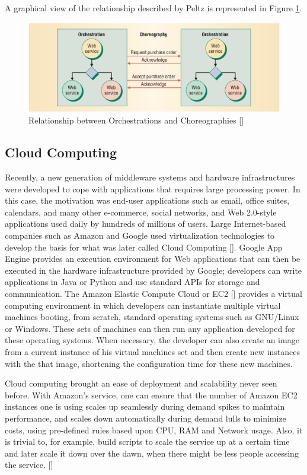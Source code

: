 A graphical view of the relationship described by Peltz is represented in Figure \ref{relation-orchestrationXchoreography}.

\begin{figure}[htb]
	\centering
	\includegraphics[width=\textwidth]{images/relation-orchestrationXchoreography}
	\caption{Relationship between Orchestrations and Choreographies [\citet{WSOC}]}
	\label{relation-orchestrationXchoreography}
\end{figure}




\subsection{Cloud Computing}
Recently, a new generation of middleware systems and hardware infrastructures were developed to cope with applications that requires large processing power. In this case, the motivation was end-user applications such as email, office suites, calendars, and many other e-commerce, social networks, and Web 2.0-style applications used daily by hundreds of millions of users. Large Internet-based companies such as Amazon and Google used virtualization technologies to develop the basis for what was later called Cloud Computing [\citet{ZCB10}]. Google App Engine provides an execution environment for Web applications that can then be executed in the hardware infrastructure provided by Google; developers can write applications in Java or Python and use standard APIs for storage and communication.  The Amazon Elastic Compute Cloud or EC2 [\citet{EC2}] provides a virtual computing environment in which developers can instantiate multiple virtual machines booting, from scratch, standard operating systems such as GNU/Linux or Windows. These sets of machines can then run any application developed for these operating systems. When necessary, the developer can also create an image from a current instance of his virtual machines set and then create new instances with the that image, shortening the configuration time for these new machines.

Cloud computing brought an ease of deployment and scalability never seen before. With Amazon's service, one can ensure that the number of Amazon EC2 instances one is using scales up seamlessly during demand spikes to maintain performance, and scales down automatically during demand lulls to minimize costs, using pre-defined rules based upon CPU, RAM and Network usage. Also, it is trivial to, for example, build scripts to scale the service up at a certain time and later scale it down over the dawn, when there might be less people accessing the service. [\citet{AUTO-SCALE}]

